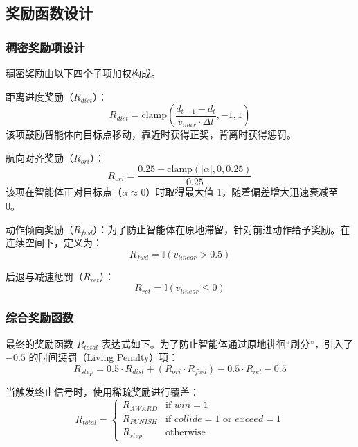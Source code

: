 \subsection{奖励函数设计}

\subsubsection{稠密奖励项设计}

稠密奖励由以下四个子项加权构成。

距离进度奖励（$R_{dist}$）：
\begin{equation}
    R_{dist} = \mathrm{clamp}\left( \frac{d_{t-1} - d_t}{v_{max} \cdot \Delta t}, -1, 1 \right)
\end{equation}
该项鼓励智能体向目标点移动，靠近时获得正奖，背离时获得惩罚。

航向对齐奖励（$R_{ori}$）：
\begin{equation}
    R_{ori} = \frac{0.25 - \mathrm{clamp}(|\alpha|, 0, 0.25)}{0.25}
\end{equation}
该项在智能体正对目标点（$\alpha \approx 0$）时取得最大值 1，随着偏差增大迅速衰减至 0。

动作倾向奖励（$R_{fwd}$）：为了防止智能体在原地滞留，针对前进动作给予奖励。在连续空间下，定义为：
\begin{equation}
    R_{fwd} = \mathbb{I}(v_{linear} > 0.5)
\end{equation}

后退与减速惩罚（$R_{ret}$）：
\begin{equation}
    R_{ret} = \mathbb{I}(v_{linear} \leq 0)
\end{equation}

\subsubsection{综合奖励函数}

最终的奖励函数 $R_{total}$ 表达式如下。为了防止智能体通过原地徘徊“刷分”，引入了 $-0.5$ 的时间惩罚（Living Penalty）项：
\begin{equation}
    R_{step} = 0.5 \cdot R_{dist} + (R_{ori} \cdot R_{fwd}) - 0.5 \cdot R_{ret} - 0.5
\end{equation}

当触发终止信号时，使用稀疏奖励进行覆盖：
\begin{equation}
    R_{total} =
    \begin{cases}
        R_{AWARD} & \text{if } win = 1 \\
        R_{PUNISH} & \text{if } collide = 1 \text{ or } exceed = 1 \\
        R_{step} & \text{otherwise}
    \end{cases}
\end{equation}

